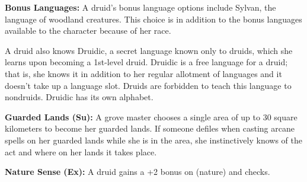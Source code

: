\textbf{Bonus Languages:} A druid's bonus language options include Sylvan, the language of woodland creatures. This choice is in addition to the bonus languages available to the character because of her race.

A druid also knows Druidic, a secret language known only to druids, which she learns upon becoming a 1st-level druid. Druidic is a free language for a druid; that is, she knows it in addition to her regular allotment of languages and it doesn't take up a language slot. Druids are forbidden to teach this language to nondruids. Druidic has its own alphabet.




\textbf{Guarded Lands (Su):} A grove master chooses a single area of up to 30 square kilometers to become her guarded lands. If someone defiles when casting arcane spells on her guarded lands while she is in the area, she instinctively knows of the act and where on her lands it takes place.

\textbf{Nature Sense (Ex):} A druid gains a +2 bonus on  (nature) and  checks.

